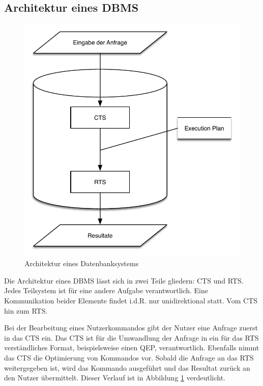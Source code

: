 \subsection{Architektur eines \ac{DBMS}}



\begin{figure}[ht]
  \centering
  \includegraphics{02_Grundlagen/CTS_RTS.pdf}
  \caption{Architektur eines Datenbanksystems}
  \label{Database_Architecture}
\end{figure}

Die Architektur eines \ac{DBMS} lässt sich in zwei Teile gliedern: \ac{CTS} und \ac{RTS}. Jedes Teilsystem ist für eine andere Aufgabe verantwortlich. Eine Kommunikation beider Elemente findet i.d.R. nur unidirektional statt. Vom \ac{CTS} hin zum \ac{RTS}.

Bei der Bearbeitung eines Nutzerkommandos gibt der Nutzer eine Anfrage zuerst in das \ac{CTS} ein. Das \ac{CTS} ist für die Umwandlung der Anfrage in ein für das \ac{RTS} verständliches Format, beispielsweise einen \ac{QEP}, verantwortlich. Ebenfalls nimmt das \ac{CTS} die Optimierung von Kommandos vor. Sobald die Anfrage an das \ac{RTS} weitergegeben ist, wird das Kommando ausgeführt und das Resultat zurück an den Nutzer übermittelt. Dieser Verlauf ist in Abbildung \ref{Database_Architecture} verdeutlicht.

